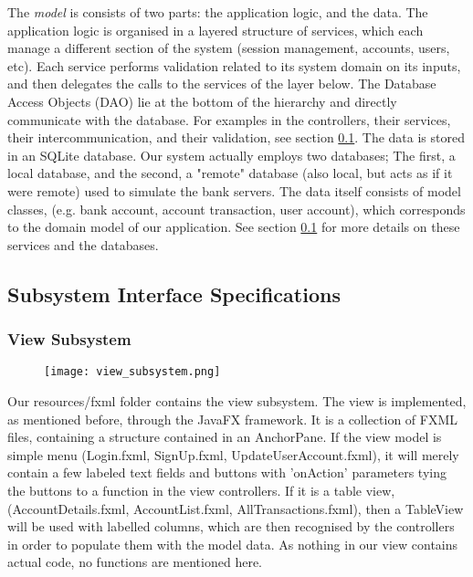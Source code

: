 \documentclass[12pt]{article}
\begin{document}
The \textit{model} is consists of two parts: the application logic, and the data. The application logic is organised in a layered structure of services, which each manage a different section of the system (session management, accounts, users, etc).
Each service performs validation related to its system domain on its inputs, and then delegates the calls to the services of the layer below. The Database Access Objects (DAO) lie  at the bottom of the hierarchy and directly communicate with the database. For examples in the controllers, their services, their intercommunication, and their validation, see section \ref{subsystem interface}.
The data is stored in an SQLite database. Our system actually employs two databases; The first, a local database, and the second, a "remote" database (also local, but acts as if it were remote) used to simulate the bank servers. The data itself consists of model classes, (e.g. bank account, account transaction, user account), which corresponds to the domain model of our application. See section \ref{subsystem interface} for more details on these services and the databases.


\subsection{Subsystem Interface Specifications} \label{subsystem interface}

\subsubsection*{View Subsystem}
\begin{figure}[H]
\texttt{[image: view\_subsystem.png]}
\end{figure}
Our resources/fxml folder contains the view subsystem. The view is implemented, as mentioned before, through the JavaFX framework. It is a collection of FXML files, containing a structure contained in an AnchorPane. If the view model is simple menu (Login.fxml, SignUp.fxml, UpdateUserAccount.fxml), it will merely contain a few labeled text fields and buttons with 'onAction' parameters tying the buttons to a function in the view controllers. If it is a table view, (AccountDetails.fxml, AccountList.fxml, AllTransactions.fxml), then a TableView will be used with labelled columns, which are then recognised by the controllers in order to populate them with the model data. As nothing in our view contains actual code,  no functions are mentioned here. 
\end{document}
